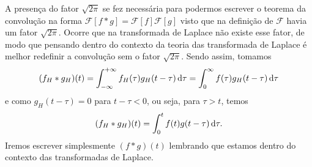 A presença do fator $\sqrt{2 \pi}$ se fez necessária para podermos escrever o
teorema da convolução na forma $\mathcal{F}[f * g] = \mathcal{F}[f]
\mathcal{F}[g]$ visto que na definição de $\mathcal{F}$ havia um fator $\sqrt{2
\pi}$. Ocorre que na transformada de Laplace não existe esse fator, de modo que
pensando dentro do contexto da teoria das transformada de Laplace é melhor
redefinir a convolução sem o fator $\sqrt{2 \pi}$. Sendo assim, tomamos
\begin{dmath*}
  (f_H * g_H)(t) = \int_{-\infty}^{+\infty} f_H(\tau) g_H(t - \tau) \vi{\tau}
  = \int_0^{\infty} f(\tau) g_H(t - \tau) \vi{\tau}
\end{dmath*}
e como $g_H(t - \tau) = 0$ para $t - \tau < 0$, ou seja, para $\tau > t$, temos
\begin{dmath*}
  (f_H * g_H)(t) = \int_0^t f(t) g(t - \tau) \vi{\tau}.
\end{dmath*}
Iremos escrever simplesmente $(f * g)(t)$ lembrando que estamos dentro do
contexto das transformadas de Laplace.

